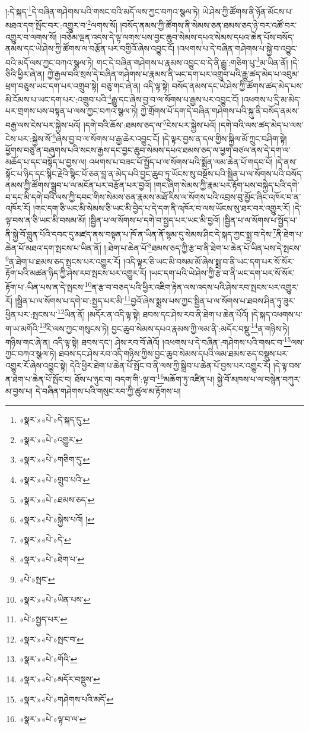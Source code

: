 །:དེ་སྐད་\footnote{«སྣར་»«པེ་»དེ་སྐད་དུ་}དེ་བཞིན་གཤེགས་པའི་གསང་བའི་མདོ་ལས་ཀྱང་བཀའ་སྩལ་ཏེ། ཡེ་ཤེས་ཀྱི་ཚོགས་ནི་ཉོན་མོངས་པ་མཐའ་དག་སྤོང་བར་:འགྱུར་བ་\footnote{«སྣར་»«པེ་»འགྱུར་}ལགས་སོ། །བསོད་ནམས་ཀྱི་ཚོགས་ནི་སེམས་ཅན་ཐམས་ཅད་ཉེ་བར་འཚོ་བར་འགྱུར་བ་ལགས་སོ། །བཅོམ་ལྡན་འདས་དེ་ལྟ་ལགས་པས་བྱང་ཆུབ་སེམས་དཔའ་སེམས་དཔའ་ཆེན་པོས་བསོད་ནམས་དང་ཡེ་ཤེས་ཀྱི་ཚོགས་ལ་བརྩོན་པར་བགྱིའོ་ཞེས་འབྱུང་ངོ། །འཕགས་པ་དེ་བཞིན་གཤེགས་པ་སྐྱེ་བ་འབྱུང་བའི་མདོ་ལས་ཀྱང་བཀའ་སྩལ་ཏེ། གང་དེ་བཞིན་གཤེགས་པ་རྣམས་འབྱུང་བ་དེ་ནི་རྒྱུ་:གཅིག་པུ་\footnote{«སྣར་»«པེ་»གཅིག་དུ་}མ་ཡིན་ནོ། །དེ་ཅིའི་ཕྱིར་ཞེ་ན། ཀྱེ་རྒྱལ་བའི་སྲས་དེ་བཞིན་གཤེགས་པ་རྣམས་ནི་ཡང་དག་པར་འགྲུབ་པའི་རྒྱུ་ཚད་མེད་པ་འབུམ་ཕྲག་བཅུས་ཡང་དག་པར་འགྲུབ་སྟེ། བཅུ་གང་ཞེ་ན། འདི་ལྟ་སྟེ། བསོད་ནམས་དང་ཡེ་ཤེས་ཀྱི་ཚོགས་ཚད་མེད་པས་མི་ངོམས་པ་ཡང་དག་པར་:འགྲུབ་པའི་\footnote{«སྣར་»«པེ་»གྲུབ་པའི་}རྒྱུ་དང་ཞེས་བྱ་བ་ལ་སོགས་པ་རྒྱས་པར་འབྱུང་ངོ། །འཕགས་པ་དྲི་མ་མེད་པར་གྲགས་པས་བསྟན་པ་ལས་ཀྱང་བཀའ་སྩལ་ཏེ། ཀྱེ་གྲོགས་པོ་དག་དེ་བཞིན་གཤེགས་པའི་སྐུ་ནི་བསོད་ནམས་བརྒྱ་ལས་ངེས་པར་སྐྱེས་པའོ། །དགེ་བའི་ཆོས་:ཐམས་ཅད་ལ་\footnote{«སྣར་»«པེ་»ཐམས་ཅད་}ངེས་པར་སྐྱེས་པའོ། །དགེ་བའི་ལས་ཚད་མེད་པ་ལས་ངེས་པར་:སྐྱེས་སོ་\footnote{«སྣར་»«པེ་»སྐྱེས་པའོ། །}ཞེས་བྱ་བ་ལ་སོགས་པ་རྒྱ་ཆེར་འབྱུང་ངོ། །དེ་ལྟར་བྱས་ན་དལ་གྱིས་སྐྱིལ་མོ་ཀྲུང་བཤིག་སྟེ། ཕྱོགས་བཅུ་ན་བཞུགས་པའི་སངས་རྒྱས་དང་བྱང་ཆུབ་སེམས་དཔའ་ཐམས་ཅད་ལ་ཕྱག་བཙལ་ནས་དེ་དག་ལ་མཆོད་པ་དང་བསྟོད་པ་བྱས་ལ། འཕགས་པ་བཟང་པོ་སྤྱོད་པ་ལ་སོགས་པའི་སྨོན་ལམ་ཆེན་པོ་གདབ་པོ། །དེ་ནས་སྟོང་པ་ཉིད་དང་སྙིང་རྗེའི་སྙིང་པོ་ཅན་བླ་ན་མེད་པའི་བྱང་ཆུབ་ཏུ་ཡོངས་སུ་བསྔོས་པའི་སྦྱིན་པ་ལ་སོགས་པའི་བསོད་ནམས་ཀྱི་ཚོགས་སྒྲུབ་པ་ལ་མངོན་པར་བརྩོན་པར་བྱའོ། །གང་ཞིག་སེམས་ཀྱི་རྣམ་པར་རྟོག་པས་བསྐྱེད་པའི་དགེ་བ་དང་མི་དགེ་བའི་ལས་ཀྱི་དབང་གིས་སེམས་ཅན་རྣམས་མཐོ་རིས་ལ་སོགས་པའི་འབྲས་བུ་མྱོང་ཞིང་འཁོར་བ་ན་འཁོར་རོ། །གང་དག་ཅི་ཡང་མི་སེམས་ཅི་ཡང་མི་བྱེད་པ་དེ་དག་ནི་འཁོར་བ་ལས་ཡོངས་སུ་ཐར་བར་འགྱུར་རོ། །དེ་ལྟ་བས་ན་ཅི་ཡང་མི་བསམ་མོ། །སྦྱིན་པ་ལ་སོགས་པ་དགེ་བ་སྤྱད་པར་ཡང་མི་བྱའོ། །སྦྱིན་པ་ལ་སོགས་པ་སྤྱོད་པ་ནི་སྐྱེ་བོ་བླུན་པོའི་དབང་དུ་མཛད་ནས་བསྟན་པ་ཁོ་ན་ཡིན་ནོ་སྙམ་དུ་སེམས་ཤིང་དེ་སྐད་ཀྱང་སྨྲ་བ་དེས་\footnote{«སྣར་»«པེ་»དེ་}ནི་ཐེག་པ་ཆེན་པོ་མཐའ་དག་སྤངས་པ་ཡིན་ནོ། །:ཐེག་པ་ཆེན་པོ་\footnote{«སྣར་»«པེ་»ཐེག་པ་}ཐམས་ཅད་ཀྱི་རྩ་བ་ནི་ཐེག་པ་ཆེན་པོ་ཡིན་པས་དེ་སྤངས་\footnote{«པེ་»སྤང་}ན་ཐེག་པ་ཐམས་ཅད་སྤངས་པར་འགྱུར་རོ། །འདི་ལྟར་ཅི་ཡང་མི་བསམ་མོ་ཞེས་སྨྲ་བ་ནི་ཡང་དག་པར་སོ་སོར་རྟོག་པའི་མཚན་ཉིད་ཀྱི་ཤེས་རབ་སྤངས་པར་འགྱུར་རོ། །ཡང་དག་པའི་ཡེ་ཤེས་ཀྱི་རྩ་བ་ནི་ཡང་དག་པར་སོ་སོར་རྟོག་པ་:ཡིན་པས་ན་དེ་སྤངས་\footnote{«སྣར་»«པེ་»ཡིན་པས་}ན་རྩ་བ་བཅད་པའི་ཕྱིར་འཇིག་རྟེན་ལས་འདས་པའི་ཤེས་རབ་སྤངས་པར་འགྱུར་རོ། །སྦྱིན་པ་ལ་སོགས་པ་དགེ་བ་:སྤྱད་པར་མི་\footnote{«པེ་»སྤྱད་པར་}བྱའོ་ཞེས་སྨྲས་པས་ཀྱང་སྦྱིན་པ་ལ་སོགས་པ་ཐབས་ཤིན་ཏུ་ཟུར་ཕྱིན་པར་:སྤངས་པ་\footnote{«སྣར་»«པེ་»སྤང་བ་}ཡིན་ནོ། །མདོར་ན་འདི་ལྟ་སྟེ། ཐབས་དང་ཤེས་རབ་ནི་ཐེག་པ་ཆེན་པོའོ། །དེ་སྐད་འཕགས་པ་ག་ཡ་མགོའི་\footnote{«སྣར་»«པེ་»གོའི་}རི་ལས་ཀྱང་གསུངས་ཏེ། བྱང་ཆུབ་སེམས་དཔའ་རྣམས་ཀྱི་ལམ་ནི་:མདོར་བསྡུ་\footnote{«སྣར་»«པེ་»མདོར་བསྡུས་}ན་གཉིས་ཏེ། གཉིས་གང་ཞེ་ན། འདི་ལྟ་སྟེ། ཐབས་དང་། ཤེས་རབ་བོ་ཞེའོ། །འཕགས་པ་དེ་བཞིན་:གཤེགས་པའི་གསང་བ་\footnote{«སྣར་»«པེ་»གཤེགས་པའི་མདོ་}ལས་ཀྱང་བཀའ་སྩལ་ཏེ། ཐབས་དང་ཤེས་རབ་འདི་གཉིས་ཀྱིས་བྱང་ཆུབ་སེམས་དཔའི་ལམ་ཐམས་ཅད་བསྡུས་པར་འགྱུར་རོ་ཞེས་འབྱུང་སྟེ། དེའི་ཕྱིར་ཐེག་པ་ཆེན་པོ་སྤོང་བ་ནི་ལས་ཀྱི་སྒྲིབ་པ་ཆེན་པོ་བྱས་པར་འགྱུར་རོ། །དེ་ལྟ་བས་ན་ཐེག་པ་ཆེན་པོ་སྤོང་བ། ཐོས་པ་ཉུང་བ། བདག་གི་:ལྟ་བ་\footnote{«སྣར་»«པེ་»ལྟ་བ་ལ་}མཆོག་ཏུ་འཛིན་པ། སྐྱེ་བོ་མཁས་པ་ལ་བསྙེན་བཀུར་མ་བྱས་པ། དེ་བཞིན་གཤེགས་པའི་གསུང་རབ་ཀྱི་ཚུལ་མ་རྟོགས་པ། 